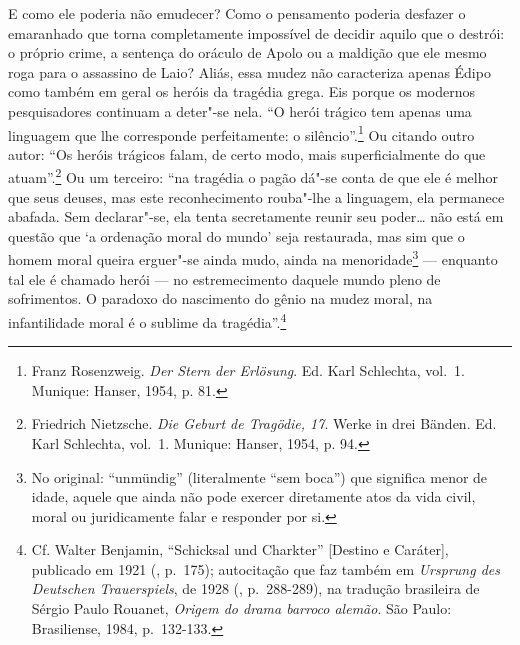 E como ele poderia não emudecer? Como o pensamento poderia desfazer o
emaranhado que torna completamente impossível de decidir aquilo que o destrói: o
próprio crime, a sentença do oráculo de Apolo ou a maldição que ele
mesmo roga para o assassino de Laio? Aliás, essa mudez não caracteriza
apenas Édipo como também em geral os heróis da tragédia grega. Eis
porque os modernos pesquisadores continuam a deter"-se nela. ``O herói
trágico tem apenas uma linguagem que lhe corresponde perfeitamente: o
silêncio''.\footnote{Franz Rosenzweig. \emph{Der Stern der
  Erlösung}. Ed. Karl Schlechta, vol.~1. Munique: Hanser, 1954, p. 81. \versal{[N.~E.]}}
Ou citando outro autor: ``Os heróis trágicos falam, de certo modo, mais
superficialmente do que atuam''.\footnote{Friedrich Nietzsche.
  \emph{Die Geburt de Tragödie, 17}. Werke in drei Bänden. Ed.
  Karl Schlechta, vol.~1. Munique: Hanser, 1954, p. 94. \versal{[N.~E.]}} Ou um terceiro: ``na
tragédia o pagão dá"-se conta de que ele é melhor que seus deuses, mas
este reconhecimento rouba"-lhe a linguagem, ela permanece abafada. Sem
declarar"-se, ela tenta secretamente reunir seu poder\ldots{} não está em
questão que `a ordenação moral do mundo' seja restaurada, mas sim que o
homem moral queira erguer"-se ainda mudo, ainda na menoridade\footnote{No original: ``unmündig'' (literalmente ``sem boca'') que significa
  menor de idade, aquele que ainda não pode exercer diretamente atos da
  vida civil, moral ou juridicamente falar e responder por si. \versal{[N. T.]}} ---
enquanto tal ele é chamado herói --- no estremecimento daquele mundo
pleno de sofrimentos. O paradoxo do nascimento do gênio na mudez moral,
na infantilidade moral é o sublime da tragédia''.\footnote{Cf.
  Walter Benjamin, ``Schicksal und Charkter'' {[}Destino e Caráter{]},
  publicado em 1921 (, p.~175); autocitação que faz também em
  \emph{Ursprung des Deutschen Trauerspiels}, de 1928 (, p.~288-289),
  na tradução brasileira de Sérgio Paulo Rouanet, \emph{Origem do drama
  barroco alemão}. São Paulo: Brasiliense, 1984, p.~132-133. \versal{[N.~T.]}}

